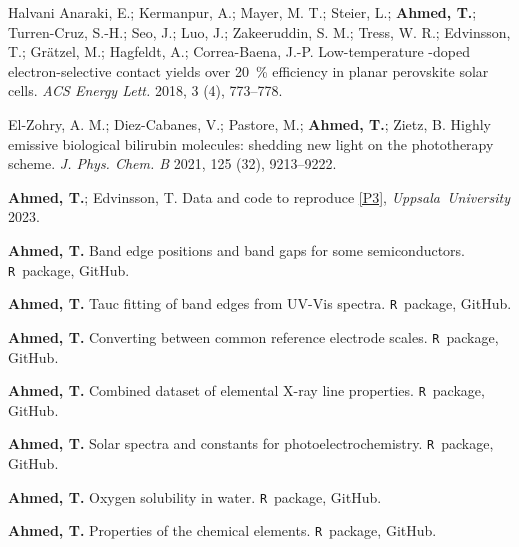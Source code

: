 \documentclass[draft,webedition,openright,titles,swedish,english]{LuaUUThesis}\usepackage[]{graphicx}\usepackage[]{xcolor}
\newcommand{\R}{\texttt{R}}
\begin{document}
\renewcommand{\listofcontributionsname}{List of other scholarly contributions}
\listofcontributionsoutro{}
\begin{listofcontributions}
   \item \label{C1}
   Halvani Anaraki, E.; Kermanpur, A.; Mayer, M. T.; Steier, L.; \textbf{Ahmed, T.}; %
   Turren-Cruz, S.-H.; Seo, J.; Luo, J.; Zakeeruddin, S. M.; Tress, W. R.; %
   Edvinsson, T.; Grätzel, M.; Hagfeldt, A.; Correa-Baena, J.-P. %
   Low-temperature -doped  electron-selective contact yields %
   over \qty{20}{\percent} efficiency in planar perovskite solar cells. %
   \textit{ACS Energy Lett.} 2018, 3 (4), 773--778. %
   \item \label{C2}
   El-Zohry, A. M.; Diez-Cabanes, V.; Pastore, M.; \textbf{Ahmed, T.}; Zietz, B. %
   Highly emissive biological bilirubin molecules: shedding new light on %
   the phototherapy scheme. %
   \textit{J. Phys. Chem. B} 2021, 125 (32), 9213--9222. %
   \item \label{jpcc2020}
   \textbf{Ahmed, T.}; Edvinsson, T. Data and code to reproduce \cref{P3},
   \textit{Uppsala~University} 2023. %
   \item \label{bandgaps}
   \textbf{Ahmed, T.} Band edge positions and band gaps for some semiconductors. %
   \R~package, GitHub. %
   \item \label{uvvistauc}
   \textbf{Ahmed, T.} Tauc fitting of band edges from UV-Vis spectra. %
   \R~package, GitHub. %
   \item \label{refelectrodes}
   \textbf{Ahmed, T.} Converting between common reference electrode scales. %
   \R~package, GitHub. %
   \item \label{xraylines}
   \textbf{Ahmed, T.} Combined dataset of elemental X-ray line properties. %
   \R~package, GitHub. %
   \item \label{photoec}
   \textbf{Ahmed, T.} Solar spectra and constants for photoelectrochemistry. %
   \R~package, GitHub. %
   \item \label{O2solubilitywater}
   \textbf{Ahmed, T.} Oxygen solubility in water. \R~package, GitHub. %
   \item \label{periodicdata}
   \textbf{Ahmed, T.} Properties of the chemical elements. %
   \R~package, GitHub. %
\end{listofcontributions}
\end{document}

